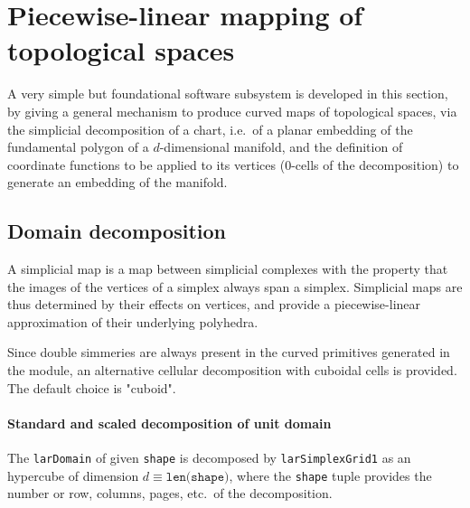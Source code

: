 \documentclass[11pt,oneside]{article}	%
\begin{document}
\section{Piecewise-linear mapping of topological spaces}

A very simple but foundational software subsystem is developed in this section, by giving a general mechanism to produce curved maps of topological spaces, via the simplicial decomposition of a chart, i.e.~of a planar embedding of the fundamental polygon of a $d$-dimensional manifold, and the definition of coordinate functions to be applied to its vertices ($0$-cells of the decomposition) to generate an embedding of the manifold.

\subsection{Domain decomposition}

A simplicial map is a map between simplicial complexes with the property that the images of the vertices of a simplex always span a simplex.  Simplicial maps are thus determined by their effects on vertices, and provide a piecewise-linear approximation of their underlying polyhedra. 

Since double simmeries are always present in the curved primitives generated in the module, an alternative cellular decomposition with cuboidal cells is provided.  The default choice is "cuboid".


\paragraph{Standard and scaled decomposition of unit domain}
The \texttt{larDomain} of given \texttt{shape} is decomposed by \texttt{larSimplexGrid1} as an hypercube of dimension $d \equiv\texttt{len(shape)}$, where the \texttt{shape} tuple provides the number or row, columns, pages, etc.~of the decomposition.
\end{document}
